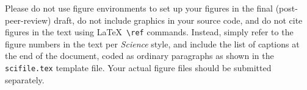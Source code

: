 \documentclass[12pt]{ctexart}
\begin{document}


\clearpage

 Please do not use figure environments to set
up your figures in the final (post-peer-review) draft, do not include graphics in your
source code, and do not cite figures in the text using \LaTeX\
\verb+\ref+ commands.  Instead, simply refer to the figure numbers in
the text per {\it Science\/} style, and include the list of captions at
the end of the document, coded as ordinary paragraphs as shown in the
\texttt{scifile.tex} template file.  Your actual figure files should
be submitted separately.
\end{document}
